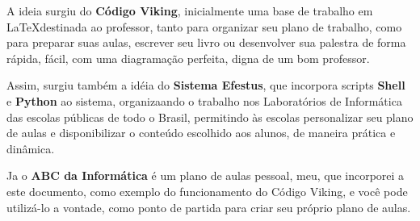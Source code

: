 \large \begin{multicols}{2}
		A ideia surgiu do \textbf{Código Viking}, inicialmente uma base de trabalho em \LaTeX \space destinada ao professor, tanto para organizar seu plano de trabalho, como para preparar suas aulas, escrever seu livro ou desenvolver sua palestra de forma rápida, fácil, com uma diagramação perfeita, digna de um bom professor.

Assim, surgiu também a idéia do \textbf{Sistema Efestus}, que incorpora scripts \textbf{Shell} e \textbf{Python} ao sistema, organizaando o trabalho nos Laboratórios de Informática das escolas públicas de todo o Brasil, permitindo às escolas personalizar seu plano de aulas e disponibilizar o conteúdo escolhido aos alunos, de maneira prática e dinâmica.

Ja o \textbf{ABC da Informática} é um plano de aulas pessoal, meu, que incorporei a este documento, como exemplo do funcionamento do Código Viking, e você pode utilizá-lo a vontade, como ponto de partida para criar seu próprio plano de aulas.
\end{multicols}


\vfill\null
\pagebreak